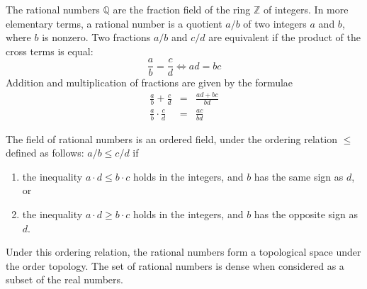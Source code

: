 \documentclass{article}
\begin{document}
The rational numbers $\mathbb{Q}$ are the fraction field of the ring $\mathbb{Z}$ of integers. In more elementary terms, a rational number is a quotient $a/b$ of two integers $a$ and $b$, where $b$ is nonzero. Two fractions $a/b$ and $c/d$ are equivalent if the product of the cross terms is equal:
$$
\frac{a}{b} = \frac{c}{d} \iff ad = bc
$$
Addition and multiplication of fractions are given by the formulae
\begin{eqnarray*}
\frac{a}{b} + \frac{c}{d} & = & \frac{ad + bc}{bd} \\
\frac{a}{b} \cdot \frac{c}{d} & = & \frac{ac}{bd}
\end{eqnarray*}

The field of rational numbers is an ordered field, under the ordering relation $\leq$ defined as follows: $a/b \leq c/d$ if
\begin{enumerate}
\item the inequality $a\cdot d \leq b \cdot c$ holds in the integers, and $b$ has the same sign as $d$, or
\item the inequality $a\cdot d \geq b \cdot c$ holds in the integers, and $b$ has the opposite sign as $d$.
\end{enumerate}
Under this ordering relation, the rational numbers form a topological space under the order topology. The set of rational numbers is dense when considered as a subset of the real numbers.
\end{document}
